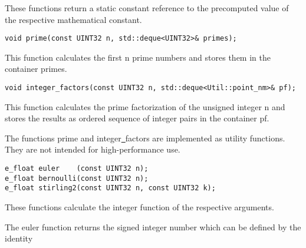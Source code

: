 \vspace{6.0pt}

 These functions return a static constant
reference to the precomputed value of the respective mathematical constant.

\vspace{6.0pt}

\begin{lstlisting}
void prime(const UINT32 n, std::deque<UINT32>& primes);
\end{lstlisting}

\vspace{6.0pt}

 This function calculates the first {\courier n}
prime numbers and stores them in the container {\courier primes}.

\begin{lstlisting}
void integer_factors(const UINT32 n, std::deque<Util::point_nm>& pf);
\end{lstlisting}

 This function calculates the prime
factorization of the unsigned integer {\courier n} and
stores the results as ordered sequence of integer pairs in
the container {\courier pf}.

\vspace{6.0pt}

 The functions {\courier prime} and
{\courier integer\underline\ factors} are implemented as utility functions.
They are not intended for high-performance use.

\vspace{6.0pt}

\begin{lstlisting}
e_float euler    (const UINT32 n);
e_float bernoulli(const UINT32 n);
e_float stirling2(const UINT32 n, const UINT32 k);
\end{lstlisting}

 These functions calculate the integer function
of the respective arguments.

\vspace{6.0pt}

 The {\courier euler} function returns the signed integer
number which can be defined by the identity \cite{wiki:website}

\vspace{6.0pt}

